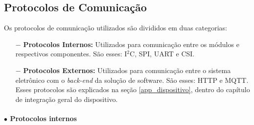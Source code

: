 \subsection{Protocolos de Comunicação}

Os protocolos de comunicação utilizados são divididos em duas categorias: 

\begin{itemize}
    \item[$-$] \textbf{Protocolos Internos:} Utilizados para comunicação entre os módulos e respectivos componentes. São esses: I$^2$C, SPI, UART e CSI.
    
    \item[$-$] \textbf{Protocolos Externos:} Utilizados para comunicação entre o sistema eletrônico com o \textit{back-end} da solução de software. São esses: HTTP e MQTT. Esses protocolos são explicados na seção \ref{app_dispositivo}, dentro do capítulo de integração geral do dispositivo.
\end{itemize}

\paragraph*{$\bullet$ \textbf{Protocolos internos}}

